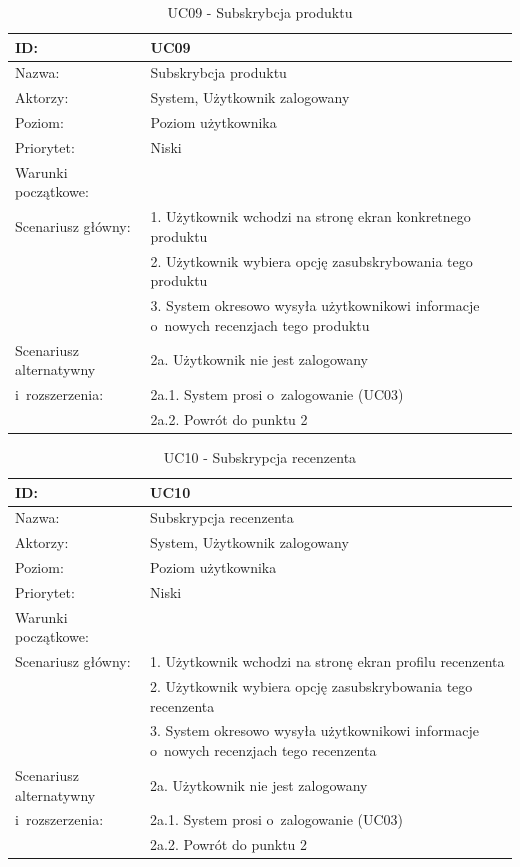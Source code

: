 \begin{table}[H]
    \begin{tabular}{|p{5cm}|p{9cm}|}\hline
    ID: & UC09 \\\hline
    Nazwa: & Subskrybcja produktu \\\hline
    Aktorzy: & System, Użytkownik zalogowany \\\hline
    Poziom: & Poziom użytkownika  \\\hline
    Priorytet: & Niski \\\hline
    Warunki początkowe: & ~ \\\hline
    Scenariusz główny: & 1. Użytkownik wchodzi na stronę ekran konkretnego produktu \\
    ~ & 2. Użytkownik wybiera opcję zasubskrybowania tego produktu \\
    ~ & 3. System okresowo wysyła użytkownikowi informacje o~nowych recenzjach tego produktu \\\hline
    Scenariusz alternatywny & 2a. Użytkownik nie jest zalogowany \\
    i~rozszerzenia: & 2a.1. System prosi o~zalogowanie (UC03) \\
    ~ & 2a.2. Powrót do punktu 2  \\
    \hline\end{tabular}
	\caption{UC09 - Subskrybcja produktu}
\end{table}
\newpage
\begin{table}[H]
    \begin{tabular}{|p{5cm}|p{9cm}|}\hline
    ID: & UC10 \\\hline
    Nazwa: & Subskrypcja recenzenta \\\hline
    Aktorzy: & System, Użytkownik zalogowany \\\hline
    Poziom: & Poziom użytkownika  \\\hline
    Priorytet: & Niski \\\hline
    Warunki początkowe: & ~ \\\hline
    Scenariusz główny: & 1. Użytkownik wchodzi na stronę ekran profilu recenzenta \\
    ~ & 2. Użytkownik wybiera opcję zasubskrybowania tego recenzenta \\
    ~ & 3. System okresowo wysyła użytkownikowi informacje o~nowych recenzjach tego recenzenta \\\hline
    Scenariusz alternatywny & 2a. Użytkownik nie jest zalogowany \\
    i~rozszerzenia: & 2a.1. System prosi o~zalogowanie (UC03) \\
    ~ & 2a.2. Powrót do punktu 2  \\
    \hline\end{tabular}
	\caption{UC10 - Subskrypcja recenzenta}
\end{table}

